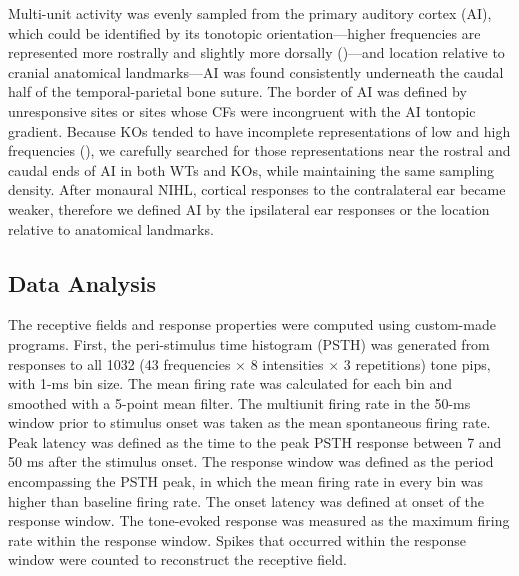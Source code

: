 Multi-unit activity was evenly sampled from the primary auditory cortex (AI), which could be identified by its tonotopic orientation---higher frequencies are represented more rostrally and slightly more dorsally (\cite{Guo2012})---and location relative to cranial anatomical landmarks---AI was found consistently underneath the caudal half of the temporal-parietal bone suture. The border of AI was defined by unresponsive sites or sites whose CFs were incongruent with the AI tontopic gradient. Because KOs tended to have incomplete representations of low and high frequencies (\cite{Yang2013}), we carefully searched for those representations near the rostral and caudal ends of AI in both WTs and KOs, while maintaining the same sampling density. After monaural NIHL, cortical responses to the contralateral ear became weaker, therefore we defined AI by the ipsilateral ear responses or the location relative to anatomical landmarks.

\subsection{Data Analysis}

The receptive fields and response properties were computed using custom-made programs. First, the peri-stimulus time histogram (PSTH) was generated from responses to all 1032 (43 frequencies $\times$ 8 intensities $\times$ 3 repetitions) tone pips, with 1-ms bin size. The mean firing rate was calculated for each bin and smoothed with a 5-point mean filter. The multiunit firing rate in the 50-ms window prior to stimulus onset was taken as the mean spontaneous firing rate. Peak latency was defined as the time to the peak PSTH response between 7 and 50 ms after the stimulus onset. The response window was defined as the period encompassing the PSTH peak, in which the mean firing rate in every bin was higher than baseline firing rate. The onset latency was defined at onset of the response window. The tone-evoked response was measured as the maximum firing rate within the response window. Spikes that occurred within the response window were counted to reconstruct the receptive field.

